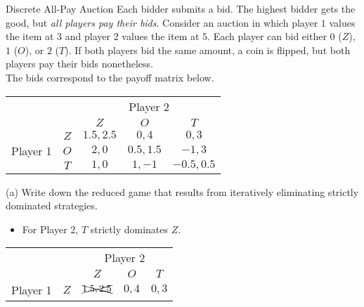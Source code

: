 \documentclass[8pt]{extarticle}
\begin{document}
  \begin{problem}{Discrete All-Pay Auction}
    Each bidder submits a bid. The highest bidder gets the good, but \textit{all players pay their bids}. Consider an auction in which player $1$ values the item at $3$ and player $2$ values the item at $5$. Each player can bid either $0$ ($Z$), $1$ ($O$), or $2$ ($T$). If both players bid the same amount, a coin is flipped, but both players pay their bids nonetheless.\\

    The bids correspond to the payoff matrix below.
    \begin{center}
      \renewcommand{\arraystretch}{1.5}
      \begin{tabular}{cc|c|c|c|}
        & \multicolumn{1}{c}{} & \multicolumn{3}{c}{Player 2} \\
        & \multicolumn{1}{c}{} & \multicolumn{1}{c}{$Z$} & \multicolumn{1}{c}{$O$} & \multicolumn{1}{c}{$T$}\\
        \cline{3-5}
        \multirow{3}{2em}{Player 1} & $Z$ & $1.5,2.5$ & $0,4$ & $0,3$ \\
        \cline{3-5}
                                    & $O$ & $2,0$ & $0.5,1.5$ & $-1,3$\\
                                    \cline{3-5}
                                    & $T$ & $1,0$ & $1,-1$ & $-0.5,0.5$\\
                                    \cline{3-5}
      \end{tabular}
    \end{center}
    \tcblower
    \begin{problem}{(a)}
      Write down the reduced game that results from iteratively eliminating strictly dominated strategies.
      \tcblower
      \begin{itemize}
        \item For Player 2, $T$ strictly dominates $Z$.
      \end{itemize}
      \begin{center}
        \renewcommand{\arraystretch}{1.5}
        \begin{tabular}{cc|c|c|c|}
          & \multicolumn{1}{c}{} & \multicolumn{3}{c}{Player 2} \\
          & \multicolumn{1}{c}{} & \multicolumn{1}{c}{$Z$} & \multicolumn{1}{c}{$O$} & \multicolumn{1}{c}{$T$}\\
          \cline{3-5}
          \multirow{3}{2em}{Player 1} & $Z$ & $\xcancel{1.5,2.5}$ & $0,4$ & $0,3$ \\

\end{tabular}
\end{center}
\end{problem}
\end{problem}
\end{document}
